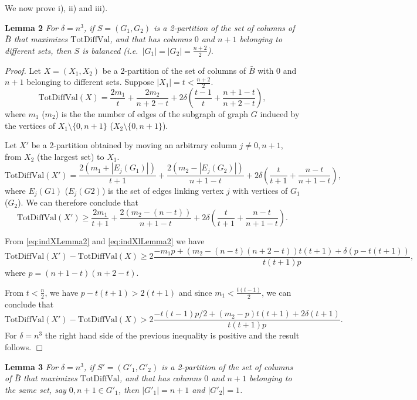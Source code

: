 We now prove i), ii) and iii). \quad

\textbf{Lemma 2} \emph{For \(\delta = n^3\), if \(S=(G_1,G_2)\) is a 2-partition of the set of columns of \(\bar{B}\) that maximizes \(\mathrm{TotDiffVal}\), and that has columns \(0\) and \(n+1\) belonging to different sets, then \(S\) is balanced (i.e.~\(|G_1|=|G_2|= \frac{n+2}{2}\)).} \quad

\emph{Proof.} Let \(X=(X_1,X_2)\) be a 2-partition of the set of columns of \(\bar{B}\) with \(0\) and \(n+1\) belonging to different sets. Suppose \(|X_1|=t < \frac{n+2}{2}\).
\begin{equation}
\mathrm{TotDiffVal}(X)=  \frac{2 m_1}{t} +  \frac{2 m_2}{n+2-t} + 2 \delta \left( \frac{t-1}{t} + \frac{n+1-t}{n+2-t} \right),
\label{eq:indXLemma2}
\end{equation}
where \(m_1\) (\(m_2\)) is the the number of edges of the subgraph of graph \(G\) induced by the vertices of \(X_1\setminus \{0,n+1\}\) (\(X_2\setminus \{0,n+1\}\)).

Let \(X'\) be a 2-partition obtained by moving an arbitrary column \(j\not=0, n+1\), from \(X_2\) (the largest set) to \(X_1\). \[ \mathrm{TotDiffVal}(X')=  \frac{2 (m_1+ |E_j(G_1)|)}{t+1} +  \frac{2 (m_2-|E_j(G_2)|)}{n+1-t} + 2 \delta \left( \frac{t}{t+1} + \frac{n-t}{n+1-t} \right),\] where \(E_j(G1)\) (\(E_j(G2)\)) is the set of edges linking vertex \(j\) with vertices of \(G_1\) (\(G_2\)). We can therefore conclude that
\begin{equation}
\mathrm{TotDiffVal}(X')\geq  \frac{2 m_1}{t+1} +  \frac{2 (m_2-(n-t))}{n+1-t} + 2 \delta \left( \frac{t}{t+1} + \frac{n-t}{n+1-t} \right).
\label{eq:indXlLemma2}
\end{equation}

From \eqref{eq:indXLemma2} and \eqref{eq:indXlLemma2} we have \[\mathrm{TotDiffVal}(X') - \mathrm{TotDiffVal}(X) \geq 2 \frac{-m_1 p  +(m_2 -  (n-t) (n+2-t) ) t (t+1)+ \delta (p -t(t+1))} {t(t+1) p},\] where \(p =(n+1-t)(n+2-t)\).

From \(t<\frac{n}{2}\), we have \(p -t(t+1)> 2(t+1)\) and since \(m_1< \frac{t(t-1)}{2}\), we can conclude that \[\mathrm{TotDiffVal}(X') - \mathrm{TotDiffVal}(X) > 2 \frac{ - t(t-1) p/2  +(m_2 -p) t (t+1) +2\delta (t+1)} {t(t+1) p}.\] For \(\delta=n^3\) the right hand side of the previous inequality is positive and the result follows. \(\Box\)

\textbf{Lemma 3} \emph{For \(\delta = n^3\), if \(S'=(G'_1,G'_2)\) is a 2-partition of the set of columns of \(\bar{B}\) that maximizes \(\mathrm{TotDiffVal}\), and that has columns \(0\) and \(n+1\) belonging to the same set, say \(0, n+1\in G'_1\), then \(|G'_1|= n+1\) and \(|G'_2|= 1\).}

